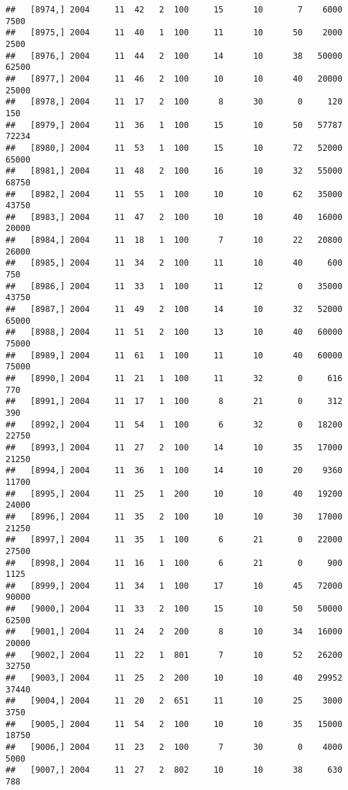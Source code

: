 \documentclass{article}\usepackage[]{graphicx}\usepackage[]{color}
\makeatletter
\newenvironment{kframe}{%
 \def\at@end@of@kframe{}%
 \ifinner\ifhmode%
  \def\at@end@of@kframe{\end{minipage}}%
  \begin{minipage}{\columnwidth}%
 \fi\fi%
 \def\FrameCommand##1{\hskip\@totalleftmargin \hskip-\fboxsep
 \colorbox{shadecolor}{##1}\hskip-\fboxsep
     \hskip-\linewidth \hskip-\@totalleftmargin \hskip\columnwidth}%
 \MakeFramed {\advance\hsize-\width
   \@totalleftmargin\z@ \linewidth\hsize
   \@setminipage}}%
 {\par\unskip\endMakeFramed%
 \at@end@of@kframe}
\newenvironment{knitrout}{}{} %
\makeatother
\begin{document}
\begin{knitrout}
\begin{kframe}
\begin{verbatim}
##   [8974,] 2004     11  42   2  100     15      10       7    6000    7500
##   [8975,] 2004     11  40   1  100     11      10      50    2000    2500
##   [8976,] 2004     11  44   2  100     14      10      38   50000   62500
##   [8977,] 2004     11  46   2  100     10      10      40   20000   25000
##   [8978,] 2004     11  17   2  100      8      30       0     120     150
##   [8979,] 2004     11  36   1  100     15      10      50   57787   72234
##   [8980,] 2004     11  53   1  100     15      10      72   52000   65000
##   [8981,] 2004     11  48   2  100     16      10      32   55000   68750
##   [8982,] 2004     11  55   1  100     10      10      62   35000   43750
##   [8983,] 2004     11  47   2  100     10      10      40   16000   20000
##   [8984,] 2004     11  18   1  100      7      10      22   20800   26000
##   [8985,] 2004     11  34   2  100     11      10      40     600     750
##   [8986,] 2004     11  33   1  100     11      12       0   35000   43750
##   [8987,] 2004     11  49   2  100     14      10      32   52000   65000
##   [8988,] 2004     11  51   2  100     13      10      40   60000   75000
##   [8989,] 2004     11  61   1  100     11      10      40   60000   75000
##   [8990,] 2004     11  21   1  100     11      32       0     616     770
##   [8991,] 2004     11  17   1  100      8      21       0     312     390
##   [8992,] 2004     11  54   1  100      6      32       0   18200   22750
##   [8993,] 2004     11  27   2  100     14      10      35   17000   21250
##   [8994,] 2004     11  36   1  100     14      10      20    9360   11700
##   [8995,] 2004     11  25   1  200     10      10      40   19200   24000
##   [8996,] 2004     11  35   2  100     10      10      30   17000   21250
##   [8997,] 2004     11  35   1  100      6      21       0   22000   27500
##   [8998,] 2004     11  16   1  100      6      21       0     900    1125
##   [8999,] 2004     11  34   1  100     17      10      45   72000   90000
##   [9000,] 2004     11  33   2  100     15      10      50   50000   62500
##   [9001,] 2004     11  24   2  200      8      10      34   16000   20000
##   [9002,] 2004     11  22   1  801      7      10      52   26200   32750
##   [9003,] 2004     11  25   2  200     10      10      40   29952   37440
##   [9004,] 2004     11  20   2  651     11      10      25    3000    3750
##   [9005,] 2004     11  54   2  100     10      10      35   15000   18750
##   [9006,] 2004     11  23   2  100      7      30       0    4000    5000
##   [9007,] 2004     11  27   2  802     10      10      38     630     788

\end{verbatim}
\end{kframe}
\end{knitrout}
\end{document}
